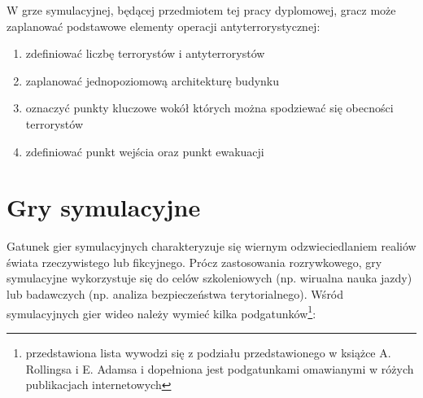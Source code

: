 W grze symulacyjnej, będącej przedmiotem tej pracy dyplomowej, gracz może zaplanować podstawowe elementy operacji antyterrorystycznej:
\begin{enumerate}
	\item zdefiniować liczbę terrorystów i antyterrorystów
	\item zaplanować jednopoziomową architekturę budynku
	\item oznaczyć punkty kluczowe wokół których można spodziewać się obecności terrorystów
	\item zdefiniować punkt wejścia oraz punkt ewakuacji
\end{enumerate}

\section{Gry symulacyjne}
Gatunek gier symulacyjnych charakteryzuje się wiernym odzwieciedlaniem realiów świata rzeczywistego lub fikcyjnego. Prócz zastosowania rozrywkowego, gry symulacyjne wykorzystuje się do celów szkoleniowych (np. wirualna nauka jazdy) lub badawczych (np. analiza bezpieczeństwa terytorialnego). Wśród symulacyjnych gier wideo należy wymieć kilka podgatunków\footnote{przedstawiona lista wywodzi się z podziału przedstawionego w książce A. Rollingsa i E. Adamsa\cite{gameDesign} i dopełniona jest podgatunkami omawianymi w różych publikacjach internetowych}:

